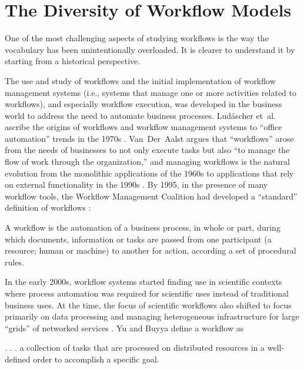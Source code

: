 \section{The Diversity of Workflow Models}\label{workflows}

One of the most challenging aspects of studying workflows is the way the
vocabulary has been unintentionally overloaded.  It is clearer to
understand it by starting from a historical perspective.

The use and study of workflows and the initial implementation of workflow
management systems (i.e., systems that manage one or more activities related to
workflows), and especially workflow execution, was developed in the business world to address the need to automate business processes. Lud\"{a}scher et~al.  ascribe the
origins of workflows and workflow management systems to ``office automation''
trends in the 1970s \cite{ludascher_scientific_2006}. Van~Der~Aalst argues that
``workflows'' arose from the needs of businesses to not only execute tasks but also
``to manage the flow of work through the organization,'' and managing
workflows is the natural evolution from the monolithic applications of the 1960s
to applications that rely on external functionality in the 1990s
\cite{van_der_aalst_application_1998}. By 1995, in the presence of many workflow
tools, the Workflow Management Coalition had developed a ``standard'' definition
of workflows \cite{hollingsworth_workflow_1993}:

\begin{displayquote} A workflow is the automation of a business process, in
whole or part, during which documents, information or tasks are passed from one
participant (a resource; human or machine) to another for action, according a
set of procedural rules.  \end{displayquote}

In the early 2000s, workflow systems started finding use in scientific contexts
where process automation was required for scientific uses instead of traditional
business uses. At the time, the focus of scientific workflows also shifted to
focus primarily on data processing and managing heterogeneous infrastructure for
large ``grids'' of networked services
\cite{yu_taxonomy_2005}. Yu and Buyya define a workflow as

\begin{displayquote}. . .  a collection of tasks that are processed on distributed
resources in a well-defined order to accomplish a specific goal.\end{displayquote}

